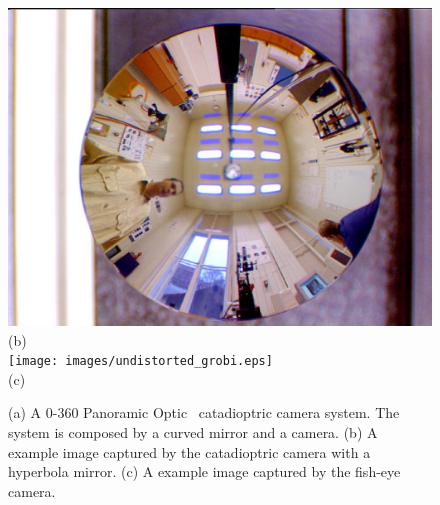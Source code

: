 \documentclass{report}
\begin{document}
\begin{savenotes}
\begin{figure}
\begin{minipage}{0.512\textwidth}
\includegraphics[width=1\textwidth]{images/cataphoto.eps}\\
(b)\\
\texttt{[image: images/undistorted\_grobi.eps]}\\
(c)
\end{minipage}
\caption{(a) A 0-360 Panoramic Optic \texttrademark \  catadioptric camera system. \protect\footnotemark[1] The system is composed by a curved mirror and a camera. (b) A example image captured by the catadioptric camera with a hyperbola mirror. \protect\footnotemark[2] (c) A example image captured by the fish-eye camera. }
\end{figure}
\end{savenotes}
\end{document}
